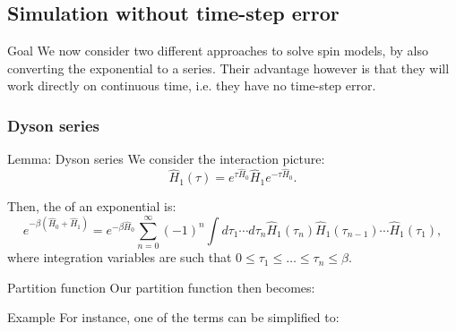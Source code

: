 \documentclass[a4paper]{article}
\begin{document}
\subsection{Simulation without time-step error}

\begin{parag}{Goal}
    We now consider two different approaches to solve spin models, by also converting the exponential to a series. Their advantage however is that they will work directly on continuous time, i.e. they have no time-step error.
\end{parag}

\subsubsection{Dyson series}

\begin{parag}{Lemma: Dyson series}
    We consider the interaction picture:
    \[\hat{H}_1\left(\tau\right) = e^{\tau \hat{H}_0} \hat{H}_1 e^{-\tau \hat{H}_0}.\]

    Then, the  of an exponential is:
    \[e^{-\beta \left(\hat{H}_0 + \hat{H}_1\right)} = e^{-\beta \hat{H}_0} \sum_{n=0}^{\infty} \left(-1\right)^n \int d \tau_1 \cdots d\tau_n \hat{H}_1\left(\tau_n\right) \hat{H}_1\left(\tau_{n-1}\right) \cdots \hat{H}_1\left(\tau_1\right),\]
    where integration variables are such that $0 \leq \tau_1 \leq \ldots \leq \tau_n \leq \beta$.
\end{parag}

\begin{parag}{Partition function}
    Our partition function then becomes: 

    \begin{subparag}{Example}
        For instance, one of the terms can be simplified to:
    \end{subparag}
\end{parag}
\end{document}
